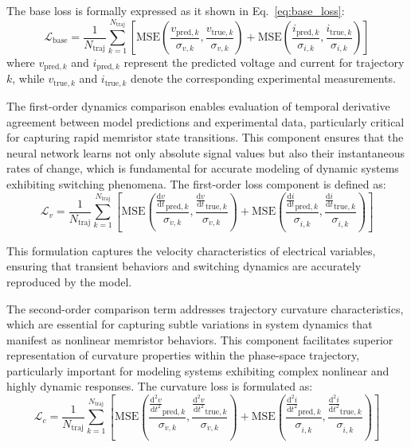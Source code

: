 \documentclass[11pt, oneside]{article}
\begin{document}
The base loss is formally expressed as it shown in Eq.~\eqref{eq:base_loss}:
\begin{equation}
    \mathcal{L}_{\mathrm{base}} = \frac{1}{N_{\text{traj}}} \sum_{k=1}^{N_{\text{traj}}} \left[\mathrm{MSE}\left(\frac{v_{\mathrm{pred},k}}{\sigma_{v,k}}, \frac{v_{\mathrm{true},k}}{\sigma_{v,k}}\right) +  \mathrm{MSE}\left(\frac{i_{\mathrm{pred},k}}{\sigma_{i,k}}, \frac{i_{\mathrm{true},k}}{\sigma_{i,k}}\right)\right]
    \label{eq:base_loss}
\end{equation}
where \(v_{\mathrm{pred},k}\) and \(i_{\mathrm{pred},k}\) represent the predicted voltage and current for trajectory \(k\), while \(v_{\mathrm{true},k}\) and \(i_{\mathrm{true},k}\) denote the corresponding experimental measurements.

The first-order dynamics comparison enables evaluation of temporal derivative agreement between model predictions and experimental data, particularly critical for capturing rapid memristor state transitions. This component ensures that the neural network learns not only absolute signal values but also their instantaneous rates of change, which is fundamental for accurate modeling of dynamic systems exhibiting switching phenomena. The first-order loss component is defined as:
\begin{equation}
    \mathcal{L}_{v} = \frac{1}{N_{\text{traj}}} \sum_{k=1}^{N_{\text{traj}}} \left[
        \mathrm{MSE}\left(\frac{\tfrac{\mathrm{d}v}{\mathrm{d}t}_{\mathrm{pred},k}}{\sigma_{\dot{v},k}}, \frac{\tfrac{\mathrm{d}v}{\mathrm{d}t}_{\mathrm{true},k}}{\sigma_{\dot{v},k}}\right) +
        \mathrm{MSE}\left(\frac{\tfrac{\mathrm{d}i}{\mathrm{d}t}_{\mathrm{pred},k}}{\sigma_{\dot{i},k}}, \frac{\tfrac{\mathrm{d}i}{\mathrm{d}t}_{\mathrm{true},k}}{\sigma_{\dot{i},k}}\right)
        \right]
    \label{eq:loss_v}
\end{equation}

This formulation captures the velocity characteristics of electrical variables, ensuring that transient behaviors and switching dynamics are accurately reproduced by the model.

The second-order comparison term addresses trajectory curvature characteristics, which are essential for capturing subtle variations in system dynamics that manifest as nonlinear memristor behaviors. This component facilitates superior representation of curvature properties within the phase-space trajectory, particularly important for modeling systems exhibiting complex nonlinear and highly dynamic responses. The curvature loss is formulated as:
\begin{equation}
    \mathcal{L}_{c} = \frac{1}{N_{\text{traj}}} \sum_{k=1}^{N_{\text{traj}}} \left[
        \mathrm{MSE}\left(\frac{\tfrac{\mathrm{d}^2 v}{\mathrm{d}t^2}_{\mathrm{pred},k}}{\sigma_{\ddot{v},k}}, \frac{\tfrac{\mathrm{d}^2 v}{\mathrm{d}t^2}_{\mathrm{true},k}}{\sigma_{\ddot{v},k}}\right) +
        \mathrm{MSE}\left(\frac{\tfrac{\mathrm{d}^2 i}{\mathrm{d}t^2}_{\mathrm{pred},k}}{\sigma_{\ddot{i},k}}, \frac{\tfrac{\mathrm{d}^2 i}{\mathrm{d}t^2}_{\mathrm{true},k}}{\sigma_{\ddot{i},k}}\right)
        \right]
    \label{eq:loss_c}
\end{equation}
\end{document}
